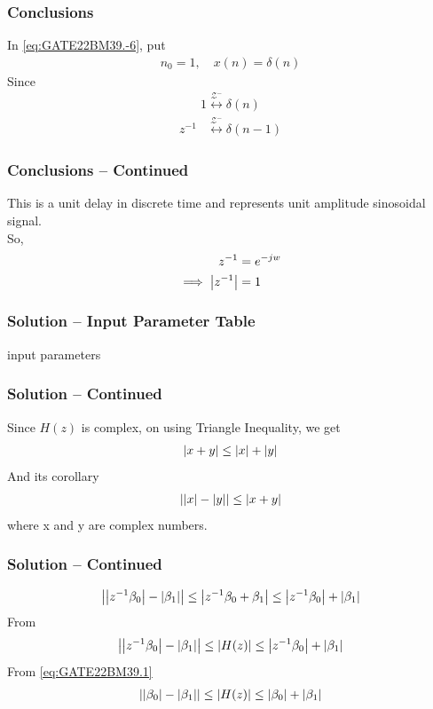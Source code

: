 \documentclass{beamer}
\begin{document}
\begin{frame}
\frametitle{Conclusions}
In \eqref{eq:GATE22BM39.-6}, put
\begin{align}
n_0 = 1, \quad x(n) = \delta(n) \nonumber 
\end{align}
Since
\begin{align}
1 \overset{\mathcal{Z^{-}}}{\longleftrightarrow} \delta(n) \nonumber
\end{align}
\begin{align}
z^{-1} &\overset{\mathcal{Z^{-}}}{\longleftrightarrow} \delta(n-1)
\end{align}
\end{frame}

\begin{frame}
\frametitle{Conclusions -- Continued}
This is a unit delay in discrete time and represents unit amplitude sinosoidal signal.\\
So,
\begin{align}
z^{-1} &= e^{-jw} \\\implies
\left\vert z^{-1}\right\vert &= 1 \label{eq:GATE22BM39.1}
\end{align}
\end{frame}


\begin{frame}
\frametitle{Solution -- Input Parameter Table}
\begin{table}[h]
    \centering
        
    \caption{input parameters}
    \label{tab:GATE22BM39.1}
\end{table}
\end{frame}


\begin{frame}
\frametitle{Solution -- Continued}
Since $H(z)$ is complex, on using Triangle Inequality, we get
\begin{align}
\left\vert x + y\right\vert \leq \left\vert x\right\vert + \left\vert y\right\vert 
\end{align}
And its corollary
\begin{align}
\left\vert\left\vert x\right\vert-\left\vert y\right\vert\right\vert \leq \left\vert x + y\right\vert
\end{align}
where x and y are complex numbers.
\end{frame}

\begin{frame}
\frametitle{Solution  -- Continued}
\begin{align}
\left\vert\left\vert z^{-1}\beta_0\right\vert-\left\vert\beta_1\right\vert\right\vert \leq \left\vert z^{-1}\beta_0 + \beta_1\right\vert \leq \left\vert z^{-1}\beta_0\right\vert + \left\vert\beta_1\right\vert 
\end{align}
From 
\begin{align}
\left\vert\left\vert z^{-1}\beta_0\right\vert-\left\vert\beta_1\right\vert\right\vert \leq \left\vert H(z)\right\vert \leq \left\vert z^{-1}\beta_0\right\vert + \left\vert\beta_1\right\vert
\end{align}
From \eqref{eq:GATE22BM39.1} 
\begin{align}
\left\vert\left\vert\beta_0\right\vert-\left\vert\beta_1\right\vert\right\vert \leq \left\vert H(z)\right\vert \leq \left\vert\beta_0\right\vert + \left\vert\beta_1\right\vert 
\end{align}
\end{frame}
\end{document}
